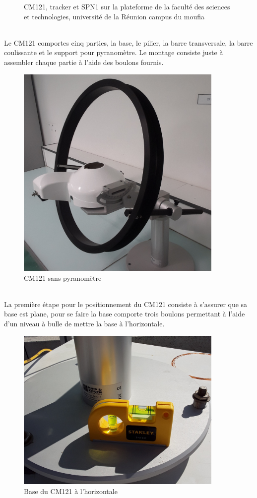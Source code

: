 \documentclass[12pt,a4paper]{article}
\begin{document}
\begin{flushleft}
\begin{figure}[H]
\begin{minipage}[c]{.3\linewidth}
    \end{minipage}
    \caption{CM121, tracker et SPN1 sur la plateforme de la faculté des sciences et technologies, université de la Réunion campus du moufia}
\end{figure}
~\\
Le CM121 comportes cinq parties, la base, le pilier, la barre transversale, la barre coulissante et le support pour pyranomètre. Le montage consiste juste à assembler chaque partie à l'aide des boulons fournis.

\begin{figure}[H]
\centering
\includegraphics[width=10cm]{image/montage/1.jpg} 
\caption{CM121 sans pyranomètre}
\end{figure}

~\\
La première étape pour le positionnement du CM121 consiste à s'assurer que sa base est plane, pour se faire la base comporte trois boulons permettant à l'aide d'un niveau à bulle de mettre la base à l'horizontale. 

\begin{figure}[H]
\centering
\includegraphics[width=10cm]{image/montage/2.jpg} 
\caption{Base du CM121 à l'horizontale}
\end{figure}


\end{flushleft}
\end{document}
